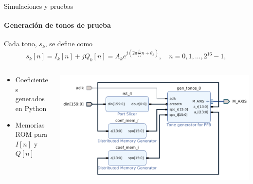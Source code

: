 \documentclass[ignorenonframetext,12pt]{beamer}
\begin{document}
\begin{frame}{Simulaciones y pruebas}
\framesubtitle{Generación de tonos de prueba}

				Cada tono, $s_k$, se define como
\begin{equation*}\label{eq:probe_signal}
        s_k[n] = I_k[n] + jQ_k[n] = A_k e^{j\left(2\pi \frac{f_k}{f_s}n +
        \theta_k \right)},\quad n = 0,1,\ldots,2^{16}-1,
\end{equation*}
				\begin{columns}
								\begin{column}{0.4\textwidth}
												\begin{itemize}
																\item Coeficientes generados en Python 
																\item Memorias ROM para $I[n]$ y $Q[n]$
												\end{itemize}
								\end{column}
								\begin{column}{0.6\textwidth}
								\includegraphics[width=1.2\textwidth]{gen_tonos_vivado}
								\end{column}
				\end{columns}
\end{frame}
\end{document}
